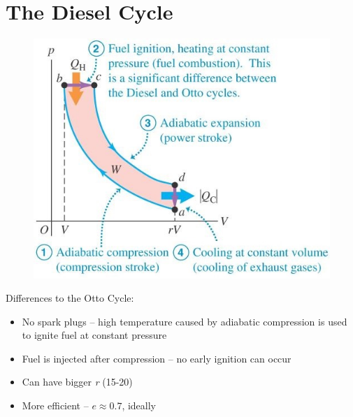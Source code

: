 \documentclass[a4paper, 11pt, normalem]{report}
\begin{document}
 \section{The Diesel Cycle}
 \begin{figure}[H]
     \centering
     \includegraphics[scale=0.8]{Diesel.jpg}
 \end{figure}
Differences to the Otto Cycle:
\begin{itemize}
	\item No spark plugs -- high temperature caused by adiabatic compression is used to ignite fuel at constant pressure
	\item Fuel is injected after compression -- no early ignition can occur
	\item Can have bigger \emph{r} (15-20)
	\item More efficient -- $e \approx 0.7$, ideally
\end{itemize}
\end{document}

